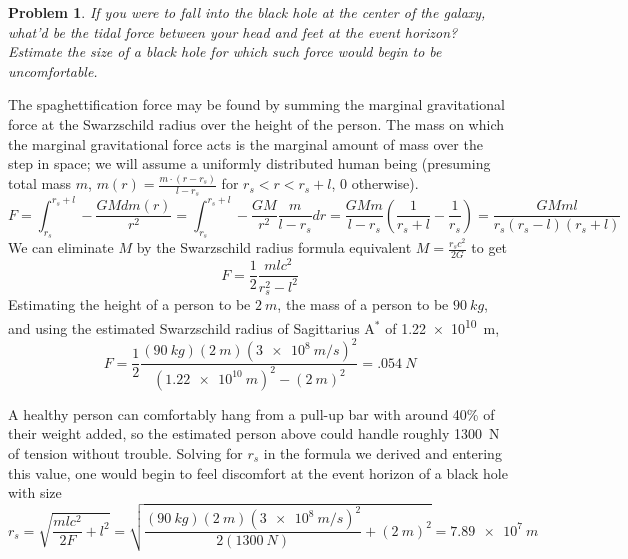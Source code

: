 \documentclass{article}
\newtheorem{prob}{Problem}
\begin{document}
\begin{prob}
  If you were to fall into the black hole at the center of the galaxy, what'd be the tidal force between your head and feet at the event horizon?
  Estimate the size of a black hole for which such force would begin to be uncomfortable.
\end{prob}

The spaghettification force may be found by summing the marginal gravitational force at the Swarzschild radius over the height of the person.
The mass on which the marginal gravitational force acts is the marginal amount of mass over the step in space;
we will assume a uniformly distributed human being (presuming total mass $m$, $m(r) = \frac{m\cdot(r-r_{s})}{l-r_{s}}$ for $r_{s}<r<r_{s}+l$, 0 otherwise).
\[
  F = \int_{r_{s}}^{r_{s}+l}-\frac{GMdm(r)}{r^{2}}
  = \int_{r_{s}}^{r_{s}+l}-\frac{GM}{r^{2}}\frac{m}{l-r_{s}}dr
  = \frac{GMm}{l-r_{s}}\left( \frac{1}{r_{s}+l}-\frac{1}{r_{s}} \right)
  = \frac{GMml}{r_{s}(r_{s}-l)(r_{s}+l)}
\]
We can eliminate $M$ by the Swarzschild radius formula equivalent $M = \frac{r_{s}c^{2}}{2G}$ to get
\[
  F = \frac{1}{2}\frac{mlc^{2}}{r_{s}^{2}-l^{2}}
\]
Estimating the height of a person to be $\SI{2}{m}$, the mass of a person to be $\SI{90}{kg}$,
and using the estimated Swarzschild radius of Sagittarius A$^{*}$ of \SI{1.22e10}{m},
\[
  F = \frac{1}{2}\frac{(\SI{90}{kg})(\SI{2}{m})(\SI{3e8}{m/s})^{2}}{(\SI{1.22e10}{m})^{2}-(\SI{2}{m})^{2}} = \SI{.054}{N}
\]

A healthy person can comfortably hang from a pull-up bar with around 40\% of their weight added,
so the estimated person above could handle roughly \SI{1300}{N} of tension without trouble.
Solving for $r_{s}$ in the formula we derived and entering this value, one would begin to feel discomfort at the event horizon of a black hole with size
\[
  r_{s} = \sqrt{\frac{mlc^{2}}{2F}+l^{2}}
  = \sqrt{\frac{(\SI{90}{kg})(\SI{2}{m})(\SI{3e8}{m/s})^{2}}{2(\SI{1300}{N})}+(\SI{2}{m})^{2}}
  = \SI{7.89e7}{m}
\]
\end{document}
